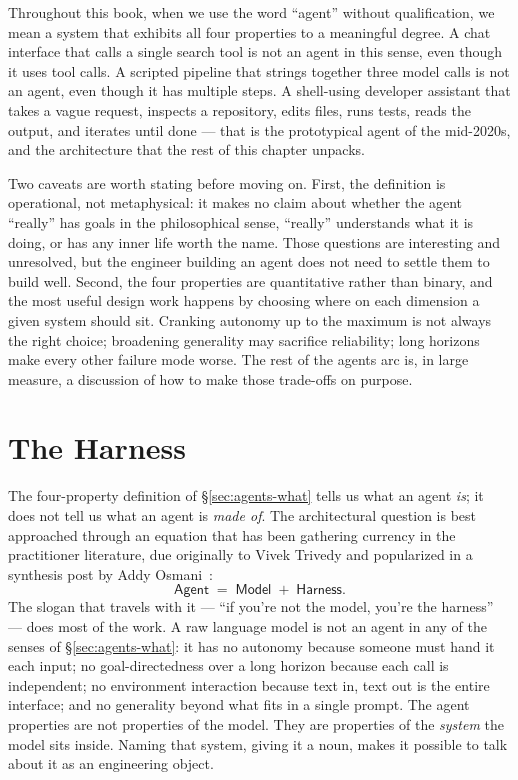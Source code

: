 \noindent
Throughout this book, when we use the word ``agent'' without
qualification, we mean a system that exhibits all four properties
to a meaningful degree. A chat interface that calls a single
search tool is not an agent in this sense, even though it uses
tool calls. A scripted pipeline that strings together three model
calls is not an agent, even though it has multiple steps. A
shell-using developer assistant that takes a vague request,
inspects a repository, edits files, runs tests, reads the output,
and iterates until done --- that is the prototypical agent of the
mid-2020s, and the architecture that the rest of this chapter
unpacks.

Two caveats are worth stating before moving on. First, the
definition is operational, not metaphysical: it makes no claim
about whether the agent ``really'' has goals in the philosophical
sense, ``really'' understands what it is doing, or has any
inner life worth the name. Those questions are interesting and
unresolved, but the engineer building an agent does not need to
settle them to build well. Second, the four properties are
quantitative rather than binary, and the most useful design work
happens by choosing where on each dimension a given system should
sit. Cranking autonomy up to the maximum is not always the right
choice; broadening generality may sacrifice reliability; long
horizons make every other failure mode worse. The rest of the
agents arc is, in large measure, a discussion of how to make
those trade-offs on purpose.

\section{The Harness}
\label{sec:agents-harness}

The four-property definition of \S\ref{sec:agents-what} tells us
what an agent \emph{is}; it does not tell us what an agent is
\emph{made of}. The architectural question is best approached
through an equation that has been gathering currency in the
practitioner literature, due originally to Vivek Trivedy and
popularized in a synthesis post by Addy
Osmani~\citep{osmani2026harness}:
\begin{equation*}
\textsf{Agent} \;=\; \textsf{Model} \;+\; \textsf{Harness}.
\end{equation*}
The slogan that travels with it --- ``if you're not the model,
you're the harness'' --- does most of the work. A raw language
model is not an agent in any of the senses of
\S\ref{sec:agents-what}: it has no autonomy because someone must
hand it each input; no goal-directedness over a long horizon
because each call is independent; no environment interaction
because text in, text out is the entire interface; and no
generality beyond what fits in a single prompt. The agent
properties are not properties of the model. They are properties
of the \emph{system} the model sits inside. Naming that system,
giving it a noun, makes it possible to talk about it as an
engineering object.

